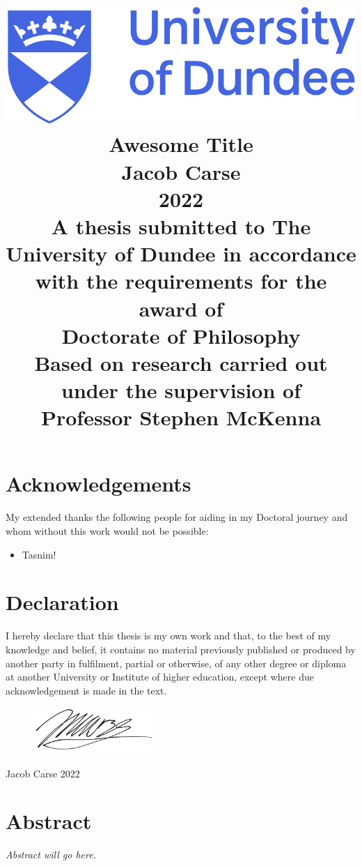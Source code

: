 \documentclass[12pt]{report}
\title{
	{\includegraphics[scale=0.4]{dundee_logo.png}}\\
	\vspace{15mm}
	{Awesome Title}\\
	\vspace{5mm}
	{\Large Jacob Carse}\\
	{\Large 2022}\\
	\vspace{5mm}
	{\normalsize A thesis submitted to The University of Dundee in accordance with the requirements for the award of}\\
	{\large Doctorate of Philosophy}\\
	\vspace{5mm}
	{\normalsize Based on research carried out under the supervision of}\\
	{\large Professor Stephen McKenna}
}
\date{\vspace{-5ex}}
\author{}
\begin{document}
	
	
	\maketitle
	
	\tableofcontents
	\listoffigures
	\listoftables
	
	\chapter*{Acknowledgements}
	My extended thanks the following people for aiding in my Doctoral journey and whom without this work would not be possible:
	
	\begin{itemize}
		\item Tasnim!
	\end{itemize}
	
	\chapter*{Declaration}
	I hereby declare that this thesis is my own work and that, to the best of my knowledge and belief, it contains no material previously published or produced by another party in fulfilment, partial or otherwise, of any other degree or diploma at another University or Institute of higher education, except where due acknowledgement is made in the text.
	
	\vspace{30pt}
	\begin{flushright}
		\begin{figure}[h]
			\begin{flushright}
				\includegraphics[width=0.4\textwidth]{images/signature.png}
			\end{flushright}
		\end{figure}
	
		Jacob Carse
		2022
	
	\end{flushright}

	\chapter*{Abstract}
	\textit{Abstract will go here.}
\end{document}
